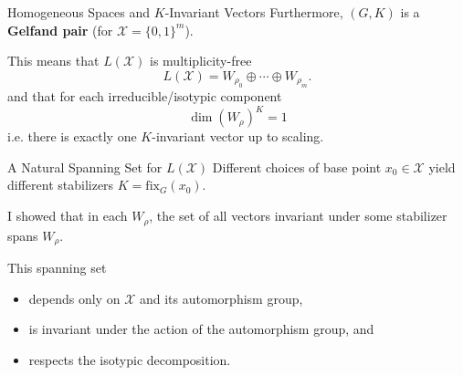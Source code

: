 \documentclass[xcolor=dvipsnames]{beamer}
\newcommand*{\xs}{\mathcal{X}}
\begin{document}
\begin{frame}{Homogeneous Spaces and $K$-Invariant Vectors}
    Furthermore, $(G, K)$ is a \textbf{Gelfand pair} (for $\xs = \{0, 1\}^m$).

    This means that $L(\xs)$ is multiplicity-free
    \[
        L(\xs) = W_{\rho_0} \oplus \cdots \oplus W_{\rho_m}.
    \]
    and that for each irreducible/isotypic component
    \[
        \dim (W_\rho)^K = 1
    \]
    i.e. there is exactly one $K$-invariant vector up to scaling.
\end{frame}

\begin{frame}{A Natural Spanning Set for $L(\xs)$}
    Different choices of base point $x_0 \in \xs$ yield different stabilizers $K
    = \mathrm{fix}_G(x_0)$.

    I showed that in each $W_\rho$, the set of all vectors invariant under some
    stabilizer spans $W_\rho$.

    This spanning set
    \begin{itemize}
    \item depends only on $\xs$ and its automorphism group, 
    \item is invariant under the action of the automorphism group, and
    \item respects the isotypic decomposition.
    \end{itemize}
\end{frame}
\end{document}
